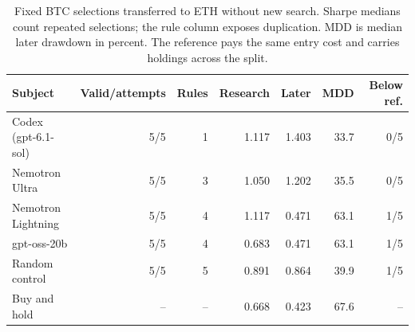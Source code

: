 \begin{table}[tbp]
\centering\small
\setlength{\tabcolsep}{4pt}
\caption{Fixed BTC selections transferred to ETH without new search. Sharpe medians count repeated selections; the rule column exposes duplication. MDD is median later drawdown in percent. The reference pays the same entry cost and carries holdings across the split.}\label{tab:eth_transfer}
\begin{tabular}{lrrrrrr}
\toprule
Subject & Valid/attempts & Rules & Research & Later & MDD & Below ref. \\
\midrule
Codex (gpt-6.1-sol) & 5/5 & 1 & 1.117 & 1.403 & 33.7 & 0/5 \\
Nemotron Ultra & 5/5 & 3 & 1.050 & 1.202 & 35.5 & 0/5 \\
Nemotron Lightning & 5/5 & 4 & 1.117 & 0.471 & 63.1 & 1/5 \\
gpt-oss-20b & 5/5 & 4 & 0.683 & 0.471 & 63.1 & 1/5 \\
Random control & 5/5 & 5 & 0.891 & 0.864 & 39.9 & 1/5 \\
Buy and hold & -- & -- & 0.668 & 0.423 & 67.6 & -- \\
\bottomrule
\end{tabular}
\end{table}

